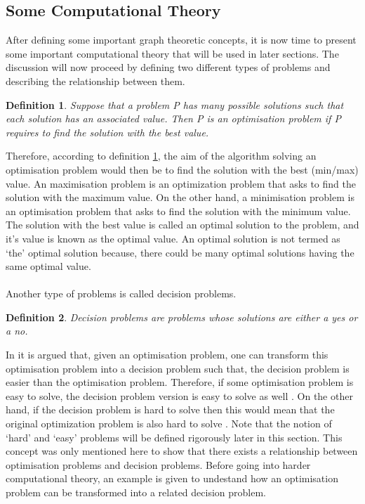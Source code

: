 \documentclass{article}
\newtheorem{definition}{Definition}[subsection]
\begin{document}
\subsection{Some Computational Theory}
After defining some important graph theoretic concepts, it is now time to present some important computational theory that will be used in later sections. The discussion will now proceed by defining two different types of problems and describing the relationship between them.
\begin{definition}
\label{optimization problems}
Suppose that a problem P has many possible solutions such that each solution has an associated value. Then P is an optimisation problem if P requires to find the solution with the best value.  
\end{definition}
Therefore, according to definition \ref{optimization problems}, the aim of the algorithm solving an optimisation problem would then be to find the solution with the best (min/max) value. An maximisation problem is an optimization problem that asks to find the solution with the maximum value. On the other hand, a minimisation problem is an optimisation problem that asks to find the solution with the minimum value. The solution with the best value is called an optimal solution to the problem, and it's value is known as the optimal value. An optimal solution is not termed as `the' optimal solution because, there could be many optimal solutions having the same optimal value. \cite{cormen_leiserson_rivest_stein} \\\\Another type of problems is called decision problems.
\begin{definition}
\label{decision problems}
Decision problems are problems whose solutions are either a yes or a no. 
\end{definition}
In \cite{cormen_leiserson_rivest_stein} it is argued that, given an optimisation problem, one can transform this optimisation problem into a decision problem such that, the decision problem is easier than the optimisation problem. Therefore, if some optimisation problem is easy to solve, the decision problem version is easy to solve as well \cite{cormen_leiserson_rivest_stein}. On the other hand, if the decision problem is hard to solve then this would mean that the original optimization problem is also hard to solve \cite{cormen_leiserson_rivest_stein}. Note that the notion of `hard' and `easy' problems will be defined rigorously later in this section. This concept was only mentioned here to show that there exists a relationship between optimisation problems and decision problems. Before going into harder computational theory, an example is given to undestand how an optimisation problem can be transformed into a related decision problem.
\end{document}
